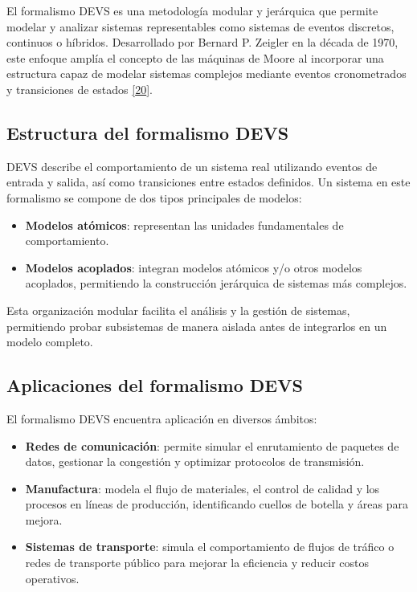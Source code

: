 \documentclass[12pt,oneside]{templates/unerthesis}
\providecommand{\tightlist}{%
  \setlength{\itemsep}{0pt}\setlength{\parskip}{0pt}}
\begin{document}
El formalismo DEVS es una metodología modular y jerárquica que permite modelar y analizar sistemas representables como sistemas de eventos discretos, continuos o híbridos. Desarrollado por Bernard P. Zeigler en la década de 1970, este enfoque amplía el concepto de las máquinas de Moore al incorporar una estructura capaz de modelar sistemas complejos mediante eventos cronometrados y transiciones de estados \protect\hyperlink{ref-zeigler_theory_2000}{{[}20{]}}.

\hypertarget{estructura-del-formalismo-devs}{%
\subsection{Estructura del formalismo DEVS}\label{estructura-del-formalismo-devs}}

DEVS describe el comportamiento de un sistema real utilizando eventos de entrada y salida, así como transiciones entre estados definidos. Un sistema en este formalismo se compone de dos tipos principales de modelos:

\begin{itemize}
\tightlist
\item
  \textbf{Modelos atómicos}: representan las unidades fundamentales de comportamiento.
\item
  \textbf{Modelos acoplados}: integran modelos atómicos y/o otros modelos acoplados, permitiendo la construcción jerárquica de sistemas más complejos.
\end{itemize}

Esta organización modular facilita el análisis y la gestión de sistemas, permitiendo probar subsistemas de manera aislada antes de integrarlos en un modelo completo.

\hypertarget{aplicaciones-del-formalismo-devs}{%
\subsection{Aplicaciones del formalismo DEVS}\label{aplicaciones-del-formalismo-devs}}

El formalismo DEVS encuentra aplicación en diversos ámbitos:

\begin{itemize}
\tightlist
\item
  \textbf{Redes de comunicación}: permite simular el enrutamiento de paquetes de datos, gestionar la congestión y optimizar protocolos de transmisión.
\item
  \textbf{Manufactura}: modela el flujo de materiales, el control de calidad y los procesos en líneas de producción, identificando cuellos de botella y áreas para mejora.
\item
  \textbf{Sistemas de transporte}: simula el comportamiento de flujos de tráfico o redes de transporte público para mejorar la eficiencia y reducir costos operativos.
\end{itemize}
\end{document}
